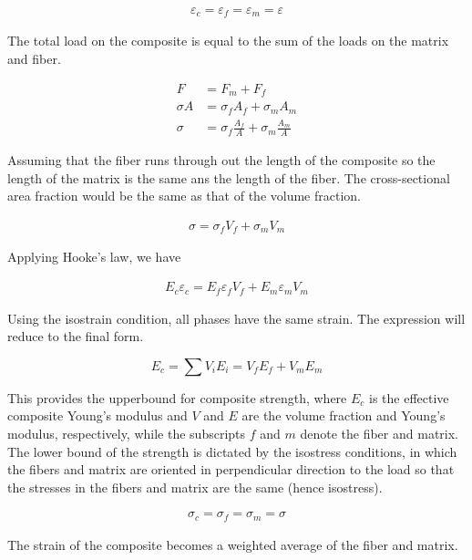 \documentclass[
10pt,
a4paper,
openany,
svgnames,
]{book}
\begin{document}
\begin{align*}
  \varepsilon_c = \varepsilon_f = \varepsilon_m = \varepsilon
\end{align*}

The total load on the composite is equal to the sum of the loads on the matrix and fiber.

\begin{align*}
  F &= F_m + F_f \\
  \sigma A &= \sigma_f A_f + \sigma_m A_m \\
  \sigma &= \sigma_f \frac{A_f}{A} + \sigma_m \frac{A_m}{A}
\end{align*}

Assuming that the fiber runs through out the length of the composite so the length of the matrix is the same ans the length of the fiber. The cross-sectional area fraction would be the same as that of the volume fraction.

\begin{align*}
  \sigma = \sigma_f V_f + \sigma_m V_m
\end{align*}

Applying Hooke's law, we have

\begin{align*}
  E_c \varepsilon_c = E_f \varepsilon_f V_f + E_m \varepsilon_m V_m
\end{align*}

Using the isostrain condition, all phases have the same strain. The expression will reduce to the final form.

\begin{equation}
  \label{eq: isostrain property for composites}
  E_c = \sum V_i E_i = V_f E_f + V_m E_m 
\end{equation}

This provides the upperbound for composite strength, where $E_c$ is the effective composite Young's modulus and $V$ and $E$ are the volume fraction and Young's modulus, respectively, while the subscripts $f$ and $m$ denote the fiber and matrix. The lower bound of the strength is dictated by the isostress conditions, in which the fibers and matrix are oriented in perpendicular direction to the load so that the stresses in the fibers and matrix are the same (hence isostress).

\begin{align*}
  \sigma_c = \sigma_{f} = \sigma_{m} = \sigma
\end{align*}

The strain of the composite becomes a weighted average of the fiber and matrix.
\end{document}
